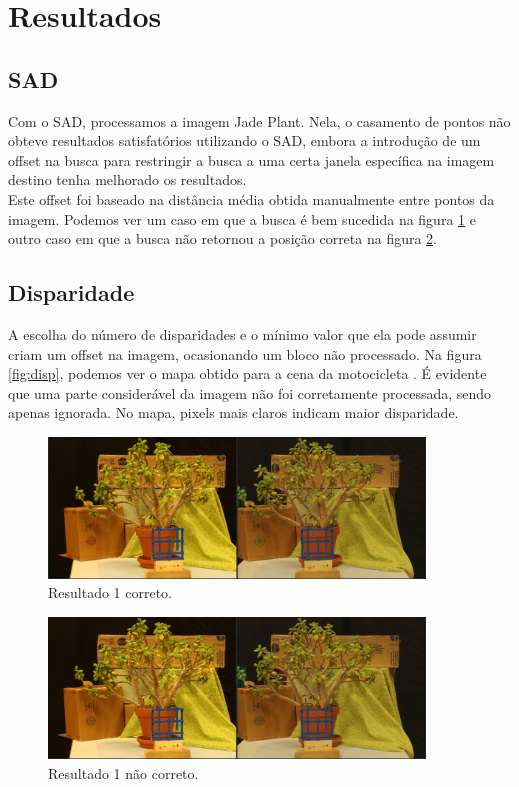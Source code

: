 \documentclass{bmvc2k}
\begin{document}
\section{Resultados}
\subsection{SAD}
Com o SAD, processamos a imagem Jade Plant. Nela, o casamento de pontos não obteve resultados satisfatórios utilizando o SAD, embora a introdução de um offset na busca para restringir a busca a uma certa janela específica na imagem destino tenha melhorado os resultados.\\
Este offset foi baseado na distância média obtida manualmente entre pontos da imagem. Podemos ver um caso em que a busca é bem sucedida na figura \ref{fig:Resultado1OK} e outro caso em que a busca não retornou a posição correta na figura \ref{fig:Resultado1NOK}.

\subsection{Disparidade}
A escolha do número de disparidades e o mínimo valor que ela pode assumir criam um offset na imagem, ocasionando um bloco não processado. Na figura \ref{fig:disp}, podemos ver o mapa obtido para a cena da motocicleta \cite{Motorcycle}. É evidente que uma parte considerável da imagem não foi corretamente processada, sendo apenas ignorada. No mapa, pixels mais claros indicam maior disparidade.

\begin{figure}[htp]
    \centering
    \includegraphics[width = 10cm]{Figs/Resultado1OK.png}
    \caption{Resultado 1 correto.}
    \label{fig:Resultado1OK}
\end{figure}

\begin{figure}[htp]
    \centering
    \includegraphics[width = 10cm]{Figs/Resultado1NOK.png}
    \caption{Resultado 1 não correto.}
    \label{fig:Resultado1NOK}
\end{figure}
\end{document}
